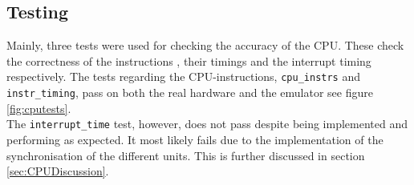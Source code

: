 \subsection{Testing}
Mainly, three tests were used for checking the accuracy of the CPU. These check the correctness of the instructions \cite{Blargg}, their timings and the interrupt timing respectively. The tests regarding the CPU-instructions, \texttt{cpu\_instrs} and \texttt{instr\_timing}, pass on both the real hardware \cite{TestROMsResult} and the emulator see figure \ref{fig:cputests}. 
\\The \texttt{interrupt\_time} test, however, does not pass despite being implemented and performing as expected. It most likely fails due to the implementation of the synchronisation of the different units. This is further discussed in section \ref{sec:CPUDiscussion}. 

